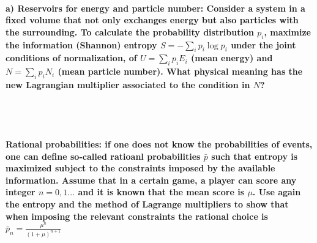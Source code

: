 \paragraph{a) Reservoirs for energy and particle number:
    Consider a system in a fixed volume that not only exchanges energy
    but also particles with the surrounding. To calculate the 
    probability distribution $p_i$, maximize the information 
    (Shannon) entropy $S=-\sum_ip_i\log{p_i}$ under the joint 
    conditions of normalization, of $U=\sum_ip_iE_i$ (mean energy) and 
    $N=\sum_ip_iN_i$ (mean particle number). What physical meaning has 
    the new Lagrangian multiplier associated to the condition in $N$?
} \ \\
\\

\paragraph{Rational probabilities: if one does not know the 
    probabilities of events, one can define so-called 
    ratioanl probabilities $\bar{p}$ such that entropy is maximized 
    subject to the constraints imposed by the available information.
    Assume that in a certain game, a player can score any integer 
    $n=0,1...$ and it is known that the mean score is $\mu$. Use again
    the entropy and the method of Lagrange multipliers to show that 
    when imposing the relevant constraints the rational choice is 
    $\bar{p}_n=\frac{\mu^n}{(1+\mu)^{n+1}}$
} \ \\
\\


